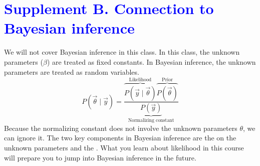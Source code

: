 \documentclass[11pt]{article}
\newcommand{\bblue}[1]{\textbf{\textcolor{blue}{#1}}}
\newcommand{\bgreen}[1]{\textbf{\color{olive}{#1}}}
\begin{document}
\section*{\bblue{Supplement B. Connection to Bayesian inference}}
\label{bayes}
We will not cover Bayesian inference in this class. In this class, the unknown parameters ($\beta$) are treated as fixed constants. In Bayesian inference, the unknown parameters are treated as random variables.
$$P(\vec\theta\mid \vec{y}) = \frac{\overbrace{P(\vec{y}\mid \vec\theta)}^\text{Likelihood}\overbrace{P(\vec\theta)}^\text{Prior}}{\underbrace{P(\vec{y})}_\text{Normalizing constant}}$$
Because the normalizing constant does not involve the unknown parameters $\theta$, we can ignore it. The two key components in Bayesian inference are the \bgreen{prior distribution} on the unknown parameters and the \bgreen{likelihood}. What you learn about likelihood in this course will prepare you to jump into Bayesian inference in the future.
\end{document}
